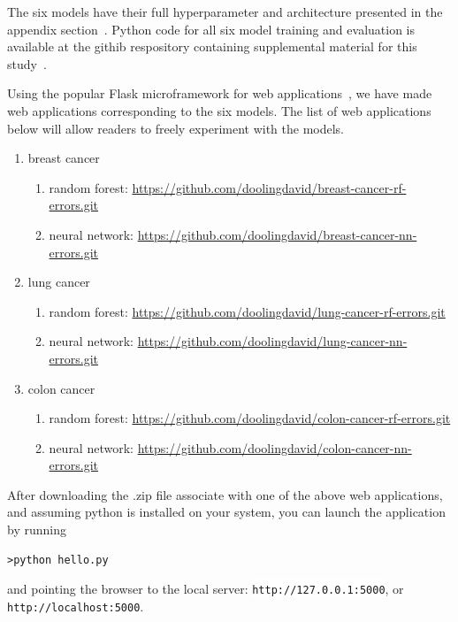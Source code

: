 \documentclass[10pt,letterpaper]{article}
\newcommand{\codewhite}[1]{\colorbox{white}{\texttt{#1}}}
\begin{document}
The six models have their full hyperparameter and architecture presented in the appendix section~. Python code for all six model training and evaluation is available at the githib respository containing supplemental material for this study~\cite{supp}.



Using the popular Flask microframework for web applications~\cite{flask}, we have made web applications corresponding to the six models. The list of web applications below will allow readers to freely experiment with the models.

\begin{enumerate}[noitemsep]
\item breast cancer 
    \begin{enumerate}[noitemsep]
    \item random forest: \url{https://github.com/doolingdavid/breast-cancer-rf-errors.git}
    \item neural network: \url{https://github.com/doolingdavid/breast-cancer-nn-errors.git}
    \end{enumerate}
\item lung cancer
   \begin{enumerate}[noitemsep]
   \item random forest: \url{https://github.com/doolingdavid/lung-cancer-rf-errors.git}
   \item neural network: \url{https://github.com/doolingdavid/lung-cancer-nn-errors.git}
    \end{enumerate}
\item colon cancer
  \begin{enumerate}[noitemsep]
   \item random forest: \url{https://github.com/doolingdavid/colon-cancer-rf-errors.git}
   \item neural network: \url{https://github.com/doolingdavid/colon-cancer-nn-errors.git}
   \end{enumerate}
\end{enumerate}

After downloading the .zip file associate with one of the above web applications, and assuming 
python is installed on your system, you can launch the application by running
\begin{verbatim}
>python hello.py
\end{verbatim}
and pointing the browser to the local server: \codewhite{http://127.0.0.1:5000}, or 
\codewhite{http://localhost:5000}.
\end{document}
